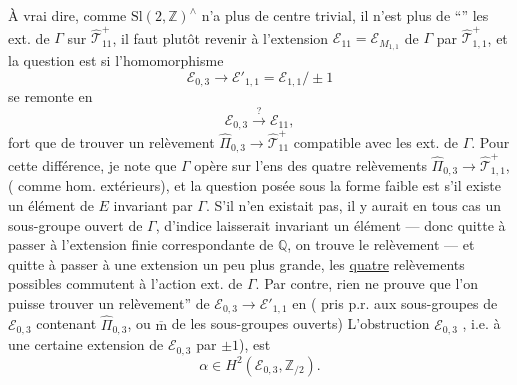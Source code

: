 À vrai dire, comme $\mathrm{Sl}(2,\mathbb Z)^{\wedge}$ n'a plus de centre trivial, il n'est plus   de  ``''  les  ext. de $\Gamma$ sur $\widehat{\mathcal T}_{11}^{+}$, il faut plutôt revenir à l'extension $\mathcal E_{11}=\mathcal E_{M_{1,1}}$ de $\Gamma$ par $\widehat{\mathcal T}_{1,1}^{+}$, et la question est si l'homomorphisme
\[
\mathcal E_{0,3}\longrightarrow\mathcal E'_{1,1}=\mathcal E_{1,1}/\pm1
\]
se remonte en
\[
\mathcal E_{0,3}\xrightarrow{?}\mathcal E_{11},
\]
 fort que de trouver un relèvement $\widehat{\Pi}_{0,3}\longrightarrow\widehat{\mathcal T}_{11}^{+}$ compatible avec les  ext. de $\Gamma$. Pour  cette différence, je note que $\Gamma$ opère sur l'ens des quatre relèvements  $\widehat{\Pi}_{0,3}\longrightarrow\widehat{\mathcal T}_{1,1}^{+}$, ( comme hom. extérieurs), et la
question posée sous la forme faible est s'il existe un élément de $E$ invariant par $\Gamma$. S'il n'en existait pas, il y aurait en tous cas un sous-groupe ouvert de $\Gamma$, d'indice    laisserait invariant un élément --- donc quitte à passer à l'extension  finie correspondante de $\mathbb Q$, on trouve le relèvement --- et quitte à passer à une extension un peu plus grande, les \uline{quatre} relèvements possibles commutent à l'action ext. de $\Gamma$. Par contre, rien ne prouve que l'on puisse trouver un  relèvement''  de $\mathcal E_{0,3}\longrightarrow\mathcal E'_{1,1}$ en  ( pris p.r. aux sous-groupes  de $\mathcal E_{0,3}$  contenant $\widehat\Pi_{0,3}$, ou $\overline{\mathrm m}$ de  les sous-groupes ouverts) L'obstruction  $\mathcal E_{0,3}$ , i.e. à \uline{} une certaine extension de $\mathcal E_{0,3}$ par  $\pm1$), est
\[
\alpha\in H^2(\mathcal E_{0,3},\mathbb Z_{/2}). \tag{36}
\]
